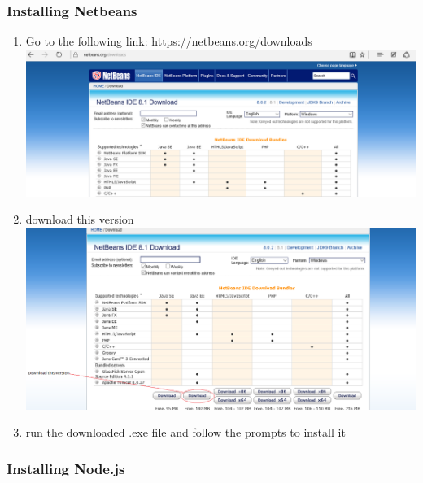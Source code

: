 \documentclass[a4paper,12pt]{article}
\begin{document}
\subsubsection{Installing Netbeans}
\begin{enumerate}
\item Go to the following link: https://netbeans.org/downloads\\[0.2cm]
\includegraphics[width=0.9\linewidth, center]{./Installation/mavenlink.PNG}\\[0.4cm] 
 
\item download this version\\
\includegraphics[width=0.9\linewidth, center]{./Installation/maven.PNG}\\[0.4cm] 
 
\item run the downloaded .exe file and follow the prompts to install it\\
\end{enumerate}
\subsubsection{Installing Node.js}
\end{document}
